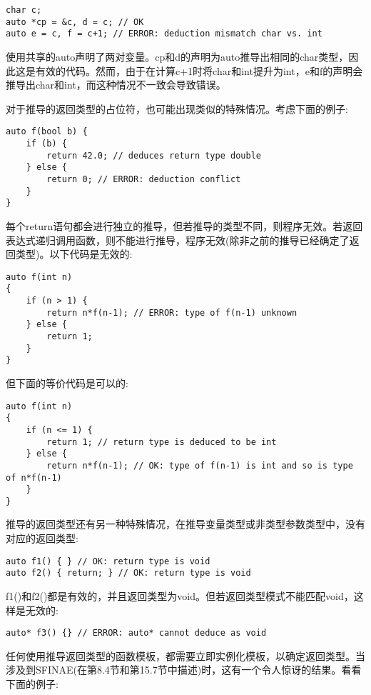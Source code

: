 \begin{lstlisting}[style=styleCXX]
char c;
auto *cp = &c, d = c; // OK
auto e = c, f = c+1; // ERROR: deduction mismatch char vs. int
\end{lstlisting}

使用共享的auto声明了两对变量。cp和d的声明为auto推导出相同的char类型，因此这是有效的代码。然而，由于在计算c+1时将char和int提升为int，e和f的声明会推导出char和int，而这种情况不一致会导致错误。

对于推导的返回类型的占位符，也可能出现类似的特殊情况。考虑下面的例子:

\begin{lstlisting}[style=styleCXX]
auto f(bool b) {
	if (b) {
		return 42.0; // deduces return type double
	} else {
		return 0; // ERROR: deduction conflict
	}
}
\end{lstlisting}

每个return语句都会进行独立的推导，但若推导的类型不同，则程序无效。若返回表达式递归调用函数，则不能进行推导，程序无效(除非之前的推导已经确定了返回类型)。以下代码是无效的:

\begin{lstlisting}[style=styleCXX]
auto f(int n)
{
	if (n > 1) {
		return n*f(n-1); // ERROR: type of f(n-1) unknown
	} else {
		return 1;
	}
}
\end{lstlisting}

但下面的等价代码是可以的:

\begin{lstlisting}[style=styleCXX]
auto f(int n)
{
	if (n <= 1) {
		return 1; // return type is deduced to be int
	} else {
		return n*f(n-1); // OK: type of f(n-1) is int and so is type of n*f(n-1)
	}
}
\end{lstlisting}

推导的返回类型还有另一种特殊情况，在推导变量类型或非类型参数类型中，没有对应的返回类型:

\begin{lstlisting}[style=styleCXX]
auto f1() { } // OK: return type is void
auto f2() { return; } // OK: return type is void
\end{lstlisting}

f1()和f2()都是有效的，并且返回类型为void。但若返回类型模式不能匹配void，这样是无效的:

\begin{lstlisting}[style=styleCXX]
auto* f3() {} // ERROR: auto* cannot deduce as void
\end{lstlisting}

任何使用推导返回类型的函数模板，都需要立即实例化模板，以确定返回类型。当涉及到SFINAE(在第8.4节和第15.7节中描述)时，这有一个令人惊讶的结果。看看下面的例子:

